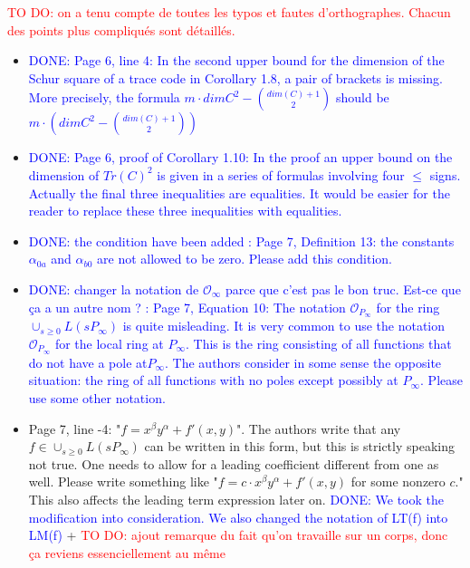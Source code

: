 \documentclass[12pt,a4paper]{amsart}
\newcommand\TODO[1]{\textcolor{red}{TO DO: #1}}
\newcommand\DONE[1]{\textcolor{blue}{DONE: #1}}
\begin{document}
\TODO{on a tenu compte de toutes les typos et fautes d'orthographes. Chacun des points plus compliqués sont détaillés.}

\begin{itemize}


\item \DONE{Page 6, line 4: In the second upper bound for the dimension of the Schur square of a trace code in Corollary 1.8, a pair of brackets is missing. More precisely, the formula $m \cdot dim C^2-\binom{dim(C)+1}{2}$ should be $m \cdot \left( dim C^2-\binom{dim(C)+1}{2}\right)$}

\item \DONE{Page 6, proof of Corollary 1.10: In the proof an upper bound on the dimension of $Tr(C)^2$ is given in a series of formulas involving four $\le$ signs. Actually the final three inequalities are equalities. It would be easier for the reader to replace these three inequalities with equalities.}


\item \DONE{the condition have been added : Page 7, Definition 13: the constants $\alpha_{0a}$ and $\alpha_{b0}$ are not allowed to be zero. Please add this condition.}

\item \DONE { changer la notation de $\mathcal{O}_\infty$ parce que c'est pas le bon truc. Est-ce que ça a un autre nom ? : Page 7, Equation 10: The notation $\mathcal{O}_{P_\infty}$ for the ring $\cup_{s \ge 0} L(sP_\infty)$ is quite misleading. It is very common to use the notation $\mathcal{O}_{P_\infty}$ for the local ring at $P_\infty$. This is the ring consisting of all functions that do not have a pole at$ P_\infty$. The authors consider in some sense the opposite situation: the ring of all functions with no poles except possibly at $P_\infty$. Please use some other notation.}


\item Page 7, line -4: "$f=x^\beta y^\alpha+f'(x,y)$". The authors write that any $f \in \cup_{s \ge 0} L(sP_\infty)$ can be written in this form, but this is strictly speaking not true. One needs to allow for a leading coefficient different from one as well. Please write something like "$f=c\cdot x^\beta y^\alpha+f'(x,y)$ for some nonzero $c$." This also affects the leading term expression later on.
\DONE{ We took the modification into consideration. We also changed the notation of LT(f) into LM(f)} + \TODO{ajout remarque du fait qu'on travaille sur un corps, donc ça reviens essenciellement au même}



\end{itemize}
\end{document}

